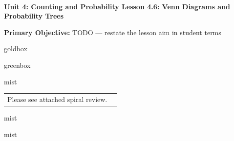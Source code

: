 \documentclass[10pt]{article}
\newcommand{\UnitNumberName}{Unit 4: Counting and Probability \quad}
\newcommand{\LessonNumberName}{Lesson 4.6: Venn Diagrams and Probability Trees}
\begin{document}
\begin{center}
    {\Large\bfseries \CourseName \\
    {\small\bfseries \UnitNumberName \LessonNumberName}}
\end{center}

\begin{tcolorbox}[colback=mist, colframe=royal, boxrule=0.9pt, arc=2mm,
    left=2mm, right=2mm, top=1.5mm, bottom=1.5mm]
    \textbf{Primary Objective:} TODO --- restate the lesson aim in student terms
\end{tcolorbox}

\renewcommand{\arraystretch}{1.6}
\begin{skillbox}{goldbox}
\end{skillbox}

\begin{skillbox}{greenbox}
\end{skillbox}

\begin{fixedskillbox}{mist}
    \begin{tabularx}{\linewidth}{@{}X c@{}}
        \begin{minipage}[t]{0.55\linewidth}\vspace{0pt}
            Please see attached spiral review.  %
        \end{minipage}
        &
        \begin{minipage}[t]{0.38\linewidth}\vspace{0pt}\centering
        \end{minipage}
    \end{tabularx}
\end{fixedskillbox}

\begin{skillbox}[Hook]{mist}
\end{skillbox}

\begin{skillbox}[Lesson]{mist}
\end{skillbox}
\end{document}
